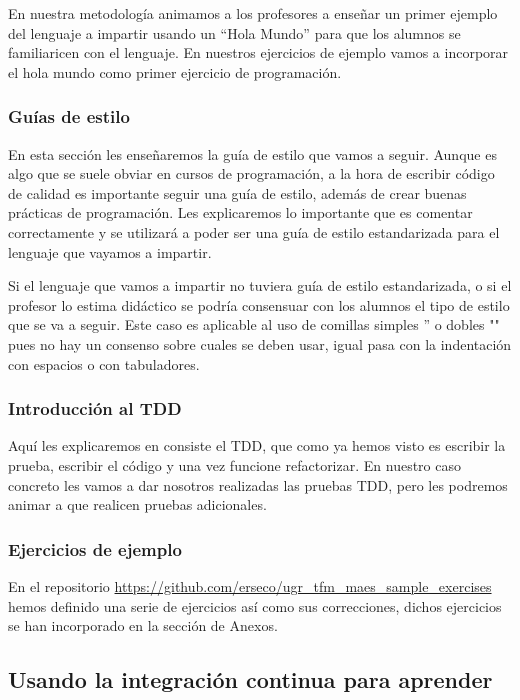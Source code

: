 \bigskip
En nuestra metodología animamos a los profesores a enseñar un primer ejemplo del lenguaje a impartir usando un ``Hola Mundo'' para que los alumnos se familiaricen con el lenguaje. En nuestros ejercicios de ejemplo vamos a incorporar el hola mundo como primer ejercicio de programación.

\subsubsection{Guías de estilo}

En esta sección les enseñaremos la guía de estilo que vamos a seguir. Aunque es algo que se suele obviar en cursos de programación, a la hora de escribir código de calidad es importante seguir una guía de estilo, además de crear buenas prácticas de programación. Les explicaremos lo importante que es comentar correctamente y se utilizará a poder ser una guía de estilo estandarizada para el lenguaje que vayamos a impartir.

\bigskip
Si el lenguaje que vamos a impartir no tuviera guía de estilo estandarizada, o si el profesor lo estima didáctico se podría consensuar con los alumnos el tipo de estilo que se va a seguir. Este caso es aplicable al uso de comillas simples '' o dobles "" pues no hay un consenso sobre cuales se deben usar, igual pasa con la indentación con espacios o con tabuladores.

\subsubsection{Introducción al TDD}

Aquí les explicaremos en consiste el TDD, que como ya hemos visto es escribir la prueba, escribir el código y una vez funcione refactorizar. En nuestro caso concreto les vamos a dar nosotros realizadas las pruebas TDD, pero les podremos animar a que realicen pruebas adicionales.

\subsubsection{Ejercicios de ejemplo}

En el repositorio \url{https://github.com/erseco/ugr_tfm_maes_sample_exercises} hemos definido una serie de ejercicios así como sus correcciones, dichos ejercicios se han incorporado en la sección de Anexos.

\subsection{Usando la integración continua para aprender}

